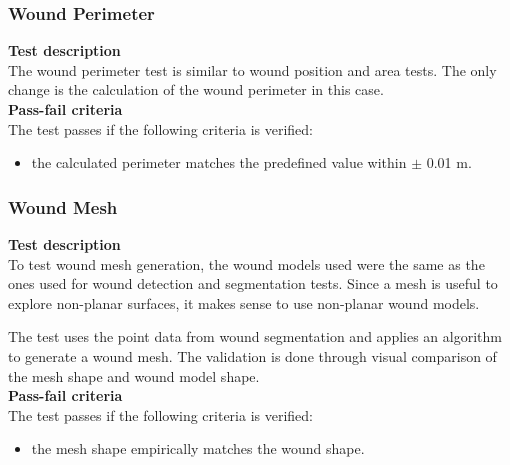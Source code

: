 
\subsubsection*{Wound Perimeter}
\label{subsubsec:system_validation_tests_setup_camera_spatial_data_processing_perimeter}

\hspace{.6cm}\textbf{Test description}\\
The wound perimeter test is similar to wound position and area tests. The only change is the calculation of the wound perimeter in this case.\\

\textbf{Pass-fail criteria}\\
The test passes if the following criteria is verified:
\begin{itemize}
    \item the calculated perimeter matches the predefined value within $\pm$ 0.01 \si{\meter}.
\end{itemize}
 

\subsubsection*{Wound Mesh}
\label{subsubsec:system_validation_tests_setup_camera_spatial_data_processing_mesh}

\hspace{.6cm}\textbf{Test description}\\
To test wound mesh generation, the wound models used were the same as the ones used for wound detection and segmentation tests. Since a mesh is useful to explore non-planar surfaces, it makes sense to use non-planar wound models.

The test uses the point data from wound segmentation and applies an algorithm to generate a wound mesh. The validation is done through visual comparison of the mesh shape and wound model shape.\\

\textbf{Pass-fail criteria}\\
The test passes if the following criteria is verified:
\begin{itemize}
    \item the mesh shape empirically matches the wound shape. 
\end{itemize}
 
